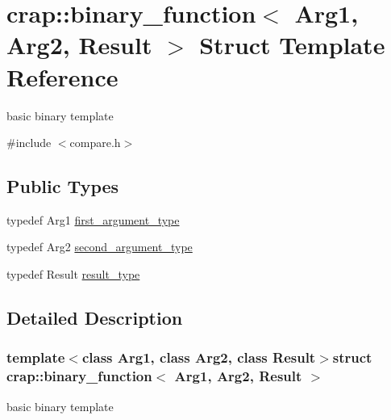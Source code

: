\hypertarget{structcrap_1_1binary__function}{\section{crap\-:\-:binary\-\_\-function$<$ Arg1, Arg2, Result $>$ Struct Template Reference}
\label{structcrap_1_1binary__function}
}


basic binary template  




{\ttfamily \#include $<$compare.\-h$>$}

\subsection*{Public Types}
\begin{DoxyCompactItemize}
\item 
typedef Arg1 \hyperlink{structcrap_1_1binary__function_a9a31c99ac4accfc4336f5fcdd0f32c9f}{first\-\_\-argument\-\_\-type}
\item 
typedef Arg2 \hyperlink{structcrap_1_1binary__function_ad778fde23d6c8d56c4e969eeae910211}{second\-\_\-argument\-\_\-type}
\item 
typedef Result \hyperlink{structcrap_1_1binary__function_a20fc043232aebcb7c1cacf6ed3cdca25}{result\-\_\-type}
\end{DoxyCompactItemize}


\subsection{Detailed Description}
\subsubsection*{template$<$class Arg1, class Arg2, class Result$>$struct crap\-::binary\-\_\-function$<$ Arg1, Arg2, Result $>$}

basic binary template 

